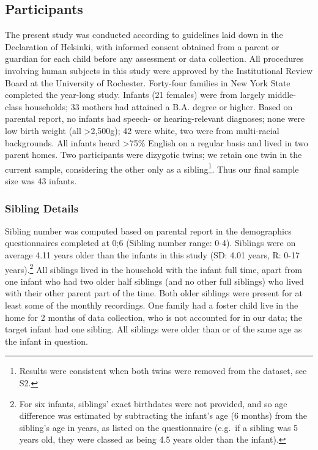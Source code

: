 \documentclass[
  man,floatsintext]{apa6}
\begin{document}
\hypertarget{participants}{%
\subsection{Participants}\label{participants}}

The present study was conducted according to guidelines laid down in the Declaration of Helsinki, with informed consent obtained from a parent or guardian for each child before any assessment or data collection. All procedures involving human subjects in this study were approved by the Institutional Review Board at the University of Rochester. Forty-four families in New York State completed the year-long study. Infants (21 females) were from largely middle-class households; 33 mothers had attained a B.A. degree or higher. Based on parental report, no infants had speech- or hearing-relevant diagnoses; none were low birth weight (all \textgreater2,500g); 42 were white, two were from multi-racial backgrounds. All infants heard \textgreater75\% English on a regular basis and lived in two parent homes. Two participants were dizygotic twins; we retain one twin in the current sample, considering the other only as a sibling\footnote{Results were consistent when both twins were removed from the dataset, see S2.}. Thus our final sample size was 43 infants.

\hypertarget{sibling-details}{%
\subsubsection{Sibling Details}\label{sibling-details}}

Sibling number was computed based on parental report in the demographics questionnaires completed at 0;6 (Sibling number range: 0-4). Siblings were on average 4.11 years older than the infants in this study (SD: 4.01 years, R: 0-17 years).\footnote{For six infants, siblings' exact birthdates were not provided, and so age difference was estimated by subtracting the infant's age (6 months) from the sibling's age in years, as listed on the questionnaire (e.g.~if a sibling was 5 years old, they were classed as being 4.5 years older than the infant).} All siblings lived in the household with the infant full time, apart from one infant who had two older half siblings (and no other full siblings) who lived with their other parent part of the time. Both older siblings were present for at least some of the monthly recordings. One family had a foster child live in the home for 2 months of data collection, who is not accounted for in our data; the target infant had one sibling. All siblings were older than or of the same age as the infant in question.
\end{document}
